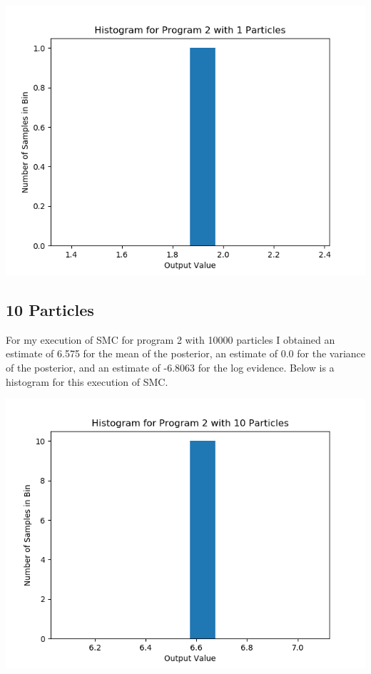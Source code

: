 \documentclass[11pt]{article}
\theoremstyle{definition}
\begin{document}
\begin{center}
\includegraphics[scale=0.5]{../plots/P2NP1.png}
\end{center}

\subsection{10 Particles}


For my execution of SMC for program 2 with 10000 particles I obtained an estimate of 6.575 for the mean of the posterior, an estimate of 0.0 for the variance of the posterior, and an estimate of -6.8063 for the log evidence. Below is a histogram for this execution of SMC.

\begin{center}
\includegraphics[scale=0.5]{../plots/P2NP10.png}
\end{center}
\end{document}
